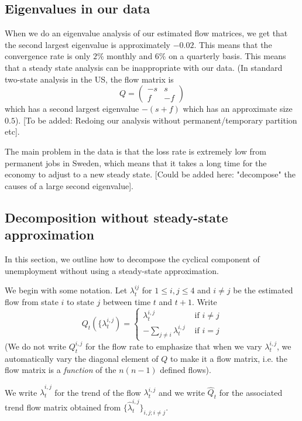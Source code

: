 \subsection{Eigenvalues in our data}
When we do an eigenvalue analysis of our estimated flow matrices, we get that the second largest eigenvalue is approximately $-0.02$. This means that the convergence rate is only $2\%$ monthly and $6\%$ on a quarterly basis. This means that a steady state analysis can be inappropriate with our data. (In standard two-state analysis in the US, the flow matrix is 
\[
Q=\left(\begin{array}{cc}
	  -s & s \\
	  f & -f\end{array}\right)
\]
which has a second largest eigenvalue $-(s+f)$ which has an approximate size $0.5$). [To be added: Redoing our analysis without permanent/temporary partition etc].

The main problem in the data is that the loss rate is extremely low from permanent jobs in Sweden, which means that it takes a long time for the economy to adjust to a new steady state. [Could be added here: "decompose" the causes of a large second eigenvalue].

\subsection{Decomposition without steady-state approximation}
In this section, we outline how to decompose the cyclical component of unemployment without using a steady-state approximation. 

We begin with some notation. Let $\lambda^{ij}_t$ for $1\le i,j\le 4$ and $i\neq j$ be the estimated flow from state $i$ to state $j$ between time $t$ and $t+1$. Write 
\[
Q_t(\{\lambda^{i,j}_t)=\left\{\begin{array}{cc}
						\lambda^{i,j}_t & \mbox{ if $i\neq j$}\\
						-\sum_{j\neq i} \lambda^{i,j}_t & \mbox{ if $i=j$}\end{array}\right.
\] 
(We do not write $Q^{i,j}_t$ for the flow rate to emphasize that when we vary $\lambda^{i,j}_t$, we automatically vary the diagonal element of $Q$ to make it a flow matrix, i.e. the flow matrix is a \emph{function} of the $n(n-1)$ defined flows).

We write $\hat{\lambda}^{i,j}_t$ for the trend of the flow $\lambda^{i,j}_t$ and we write $\hat{Q}_t$ for the associated trend flow matrix obtained from $\{\hat{\lambda}^{i,j}_t\}_{i,j; i\neq j}$. 

